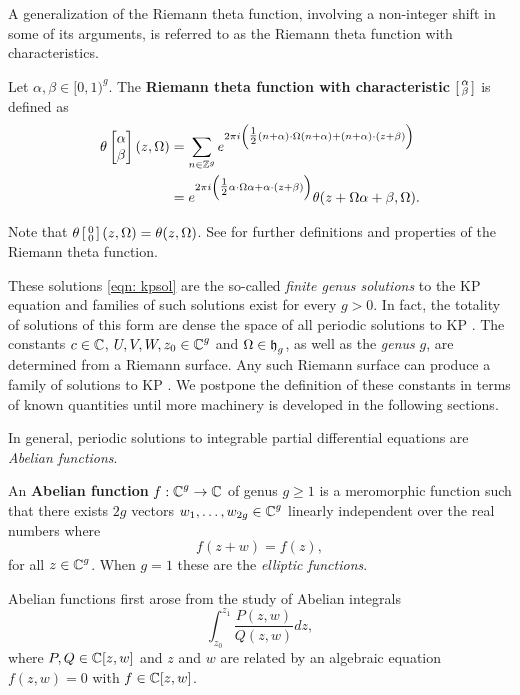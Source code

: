 A generalization of the Riemann theta function, involving a non-integer
shift in some of its arguments, is referred to as the Riemann theta
function with characteristics.

\begin{definition} \label{def: thetachar}
Let $\alpha,\beta \in [0,1)^{g}$. The {\bf Riemann theta function with
characteristic $\left[ \begin{smallmatrix} \alpha \\ \beta \end{smallmatrix} \right]$} is defined as
\begin{align*}
  \theta\begin{bmatrix}\alpha\\\beta\end{bmatrix}(z, \Omega) &=
  \sum_{n \in \mathbb{Z}^g}
  e^{2 \pi i \left( \tfrac{1}{2} (n+\alpha) \cdot \Omega (n+\alpha) +
    (n + \alpha) \cdot (z + \beta) \right) } \\
  &=
  e^{2\pi i \left( \tfrac{1}{2} \alpha \cdot \Omega \alpha +
    \alpha \cdot (z + \beta) \right)}
  \theta(z + \Omega \alpha + \beta, \Omega).
\end{align*}
\end{definition}

Note that $\theta \left[ \begin{smallmatrix} 0 \\ 0 \end{smallmatrix} \right](z,\Omega) = \theta(z,\Omega)$. See
\cite{NIST:DLMF,MumfordI07,MumfordII07} for further definitions and
properties of the Riemann theta function.

These solutions \eqref{eqn: kpsol} are the so-called {\it finite genus
  solutions} to the KP equation and families of such solutions exist for
every $g > 0$. In fact, the totality of solutions of this form are dense
the space of all periodic solutions to KP \cite{Krichever93}. The
constants $c\in\operatorname{\mathbb{C}}$, $U,V,W,z_0 \in \operatorname{\mathbb{C}}^g$ and $\Omega \in \operatorname{\mathfrak{h}}_g$, as
well as the {\it genus} $g$, are determined from a Riemann surface. Any
such Riemann surface can produce a family of solutions to KP
\cite{Dubrovin81}. We postpone the definition of these constants in
terms of known quantities until more machinery is developed in the
following sections.

In general, periodic solutions to integrable partial differential
equations are {\it Abelian functions}.
\begin{definition} \label{def: abelian-function}
  An {\bf Abelian function} $f : \operatorname{\mathbb{C}}^g \to \operatorname{\mathbb{C}}$ of genus $g \geq 1$ is a
  meromorphic function such that there exists $2g$ vectors
  $w_1,\ldots,w_{2g} \in \operatorname{\mathbb{C}}^g$ linearly independent over the real
  numbers where
  \[
      f(z + w) = f(z),
  \]
  for all $z \in \operatorname{\mathbb{C}}^g$. When $g=1$ these are the {\it elliptic
    functions}.
\end{definition}
Abelian functions first arose from the study of Abelian integrals
\[
    \int_{z_0}^{z_1} \frac{P(z,w)}{Q(z,w)}dz,
\]
where $P,Q \in \operatorname{\mathbb{C}}[z,w]$ and $z$ and $w$ are related by an algebraic
equation $f(z,w) = 0$ with $f \in \operatorname{\mathbb{C}}[z,w]$.

